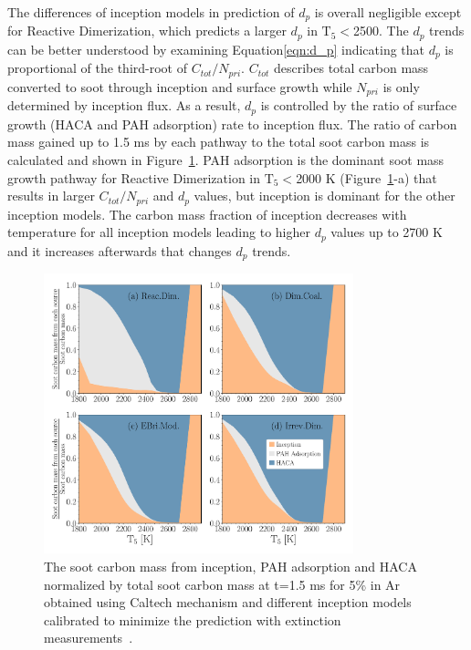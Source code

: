 The differences of inception models in prediction of $d_p$  is overall negligible except for Reactive Dimerization, which predicts a larger $d_p$ in $\mathrm{T_5}<$2500. The $d_p$ trends can be better understood by examining Equation\eqref{eqn:d_p} indicating that $d_p$ is proportional of the third-root of $C_{tot}/N_{pri}$. $C_{tot}$ describes total carbon mass converted to soot through inception and surface growth while $N_{pri}$ is only determined by inception flux. As a result, $d_p$ is controlled by the ratio of surface growth (HACA and PAH adsorption) rate to inception flux. The ratio of carbon mass gained up to 1.5 ms by each pathway to the total soot carbon mass is calculated and shown in Figure~\ref{fig:shockagof_carbon_map_cpr}. PAH adsorption is the dominant soot mass growth pathway for Reactive Dimerization in $\mathrm{T_5}<$2000 K (Figure~\ref{fig:shockagof_carbon_map_cpr}-a) that results in larger $C_{tot}/N_{pri}$ and $d_p$ values, but inception is dominant for the other inception models. The carbon mass fraction of inception decreases with temperature for all inception models leading to higher $d_p$ values up to 2700 K and it increases afterwards that changes $d_p$ trends.


\begin{figure}[H]
	\centering
	\includegraphics[width=0.8\textwidth]{Figures/Results/Shocktube/Agafonov2016_cpr/C_tot_distmap_5CH4.pdf}
	\caption{The soot carbon mass from inception, PAH adsorption and HACA normalized by total soot carbon mass at t=1.5 ms for 5\% in Ar obtained using Caltech mechanism and different inception models calibrated to minimize the prediction with extinction measurements~\citep{agafonov2016unified}.}
	\label{fig:shockagof_carbon_map_cpr} 
\end{figure}


